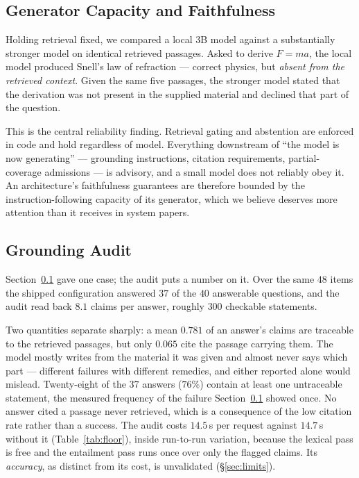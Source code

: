 \documentclass[conference]{IEEEtran}
\begin{document}
\subsection{Generator Capacity and Faithfulness}
\label{sec:faithfulness}
Holding retrieval fixed, we compared a local $3$B model against a substantially
stronger model on identical retrieved passages. Asked to derive $F = ma$, the
local model produced Snell's law of refraction --- correct physics, but
\emph{absent from the retrieved context}. Given the same five passages, the
stronger model stated that the derivation was not present in the supplied
material and declined that part of the question.

This is the central reliability finding. Retrieval gating and abstention are
enforced in code and hold regardless of model. Everything downstream of ``the
model is now generating'' --- grounding instructions, citation requirements,
partial-coverage admissions --- is advisory, and a small model does not reliably
obey it. An architecture's faithfulness guarantees are therefore bounded by the
instruction-following capacity of its generator, which we believe deserves more
attention than it receives in system papers.

\subsection{Grounding Audit}
\label{sec:groundingeval}
Section~\ref{sec:faithfulness} gave one case; the audit puts a number on it.
Over the same $48$ items the shipped configuration answered $37$ of the $40$
answerable questions, and the audit read back $8.1$ claims per answer, roughly
$300$ checkable statements.

Two quantities separate sharply: a mean $0.781$ of an answer's claims are
traceable to the retrieved passages, but only $0.065$ cite the passage carrying
them. The model mostly writes from the material it was given and almost never
says which part --- different failures with different remedies, and either
reported alone would mislead. Twenty-eight of the $37$ answers ($76\%$) contain
at least one untraceable statement, the measured frequency of the failure
Section~\ref{sec:faithfulness} showed once. No answer cited a passage never
retrieved, which is a consequence of the low citation rate rather than a
success. The audit costs $14.5$\,s per request against $14.7$\,s without it
(Table~\ref{tab:floor}), inside run-to-run variation, because the lexical pass
is free and the entailment pass runs once over only the flagged claims. Its
\emph{accuracy}, as distinct from its cost, is unvalidated (§\ref{sec:limits}).
\end{document}
